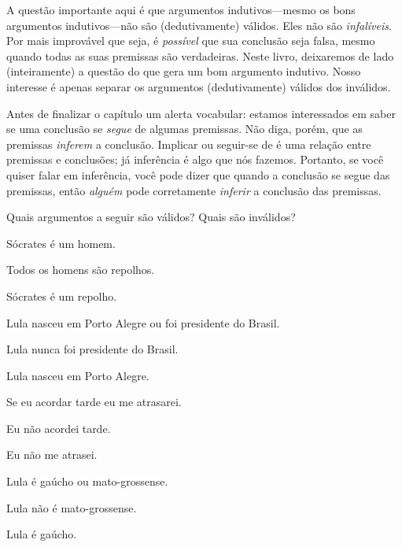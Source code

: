 A questão importante aqui é que argumentos indutivos---mesmo os bons argumentos indutivos---não são (dedutivamente) válidos.
Eles não são \emph{infalíveis}.
Por mais improvável que seja, é \emph{possível} que sua conclusão seja falsa, mesmo quando todas as suas premissas são verdadeiras.
Neste livro, deixaremos de lado (inteiramente) a questão do que gera um bom argumento indutivo.
Nosso interesse é apenas separar os argumentos (dedutivamente) válidos dos inválidos.

Antes de finalizar o capítulo um alerta vocabular: estamos interessados em saber se uma conclusão se \emph{segue} de algumas premissas.
Não diga, porém, que as premissas \emph{inferem} a conclusão.
Implicar ou seguir-se de é uma relação entre premissas e conclusões; já inferência é algo que nós fazemos.
Portanto, se você quiser falar em inferência, você pode dizer que quando a conclusão se segue das premissas, então \emph{alguém} pode corretamente \emph{inferir} a conclusão das premissas.


\practiceproblems
\problempart
Quais argumentos a seguir são válidos? Quais são inválidos?

\begin{earg}
\item Sócrates é um homem.
\item Todos os homens são repolhos.
\item[\therefore] Sócrates é um repolho.
\end{earg}

\begin{earg}
\item  Lula nasceu em Porto Alegre ou foi presidente do Brasil.
\item Lula nunca foi presidente do Brasil.
\item[\therefore] Lula nasceu em Porto Alegre.
\end{earg}

\begin{earg}
\item Se eu acordar tarde eu me atrasarei.
\item Eu não acordei tarde.
\item[\therefore] Eu não me atrasei.
\end{earg}

\begin{earg}
\item Lula é gaúcho ou mato-grossense.
\item Lula não é mato-grossense.
\item[\therefore] Lula é gaúcho.
\end{earg}

